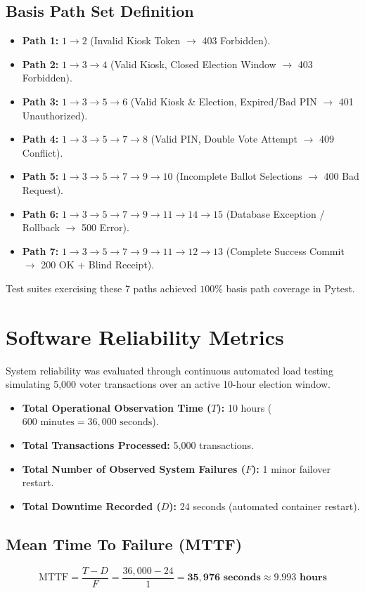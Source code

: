 \documentclass[12pt,a4paper,oneside]{report}
\begin{document}
\subsection{Basis Path Set Definition}
\begin{itemize}
    \item \textbf{Path 1:} $1 \to 2$ (Invalid Kiosk Token $\to$ 403 Forbidden).
    \item \textbf{Path 2:} $1 \to 3 \to 4$ (Valid Kiosk, Closed Election Window $\to$ 403 Forbidden).
    \item \textbf{Path 3:} $1 \to 3 \to 5 \to 6$ (Valid Kiosk \& Election, Expired/Bad PIN $\to$ 401 Unauthorized).
    \item \textbf{Path 4:} $1 \to 3 \to 5 \to 7 \to 8$ (Valid PIN, Double Vote Attempt $\to$ 409 Conflict).
    \item \textbf{Path 5:} $1 \to 3 \to 5 \to 7 \to 9 \to 10$ (Incomplete Ballot Selections $\to$ 400 Bad Request).
    \item \textbf{Path 6:} $1 \to 3 \to 5 \to 7 \to 9 \to 11 \to 14 \to 15$ (Database Exception / Rollback $\to$ 500 Error).
    \item \textbf{Path 7:} $1 \to 3 \to 5 \to 7 \to 9 \to 11 \to 12 \to 13$ (Complete Success Commit $\to$ 200 OK + Blind Receipt).
\end{itemize}
Test suites exercising these 7 paths achieved $100\%$ basis path coverage in Pytest.

\section{Software Reliability Metrics}
System reliability was evaluated through continuous automated load testing simulating 5,000 voter transactions over an active 10-hour election window.
\begin{itemize}
    \item \textbf{Total Operational Observation Time ($T$):} 10 hours ($600\text{ minutes} = 36,000\text{ seconds}$).
    \item \textbf{Total Transactions Processed:} 5,000 transactions.
    \item \textbf{Total Number of Observed System Failures ($F$):} 1 minor failover restart.
    \item \textbf{Total Downtime Recorded ($D$):} 24 seconds (automated container restart).
\end{itemize}

\subsection{Mean Time To Failure (MTTF)}
\begin{equation}
    \text{MTTF} = \frac{T - D}{F} = \frac{36,000 - 24}{1} = \mathbf{35,976 \text{ seconds} \approx 9.993 \text{ hours}}
\end{equation}
\end{document}

